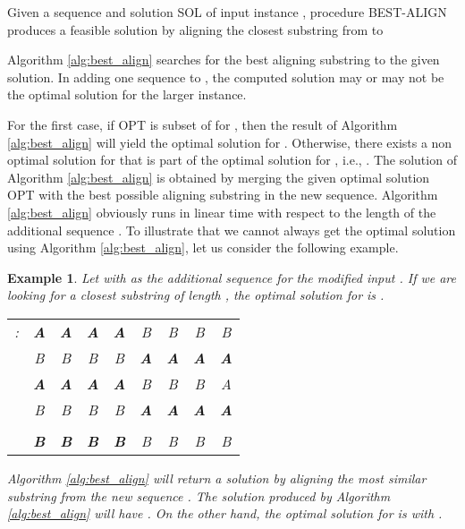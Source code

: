 \documentclass[journal]{acm_proc_article-sp}
\newtheorem{example}{Example}
\begin{document}
\begin{algorithm} 
\caption{Given a sequence  and solution SOL of input instance , procedure BEST-ALIGN produces a feasible solution  by aligning the closest substring from  to }
\label{alg:best_align}
\begin{algorithmic}[1]
\State{ }
\If{ }
\State{}
\State{}
\EndIf
\EndFor
\State{}
\EndProcedure
\end{algorithmic}
\end{algorithm}

Algorithm \ref{alg:best_align} searches for the best aligning substring  to the given solution. In adding one sequence to , the computed solution may or may not be the optimal solution for the larger instance. 

For the first case, if OPT is subset of  for , then the result of Algorithm \ref{alg:best_align} will yield the optimal solution for . Otherwise, there exists a non optimal solution for  that is part of the optimal solution for , i.e., . The solution  of Algorithm \ref{alg:best_align} is obtained by merging the given optimal solution OPT with the best possible aligning substring in the new sequence. Algorithm \ref{alg:best_align} obviously runs in linear time with respect to the length of the additional sequence . 
To illustrate that we cannot always get the optimal solution using Algorithm \ref{alg:best_align}, let us consider the following example.

\begin{example} \label{ex:1}
Let  with  as the additional sequence for the modified input . If we are looking for a closest substring of length , the optimal solution for  is  .  

\begin{center}
\begin{tabular}{ r  c c c c c c c c}
: &  {\bf A} & {\bf A} & {\bf A} & {\bf A} & B & B & B & B \\
 & B & B & B & B &  {\bf A} & {\bf A} & {\bf A} & {\bf A}  \\
 & {\bf A} & {\bf A} & {\bf A} & {\bf A} & B & B & B & A \\
 & B & B & B & B &  {\bf A} & {\bf A} & {\bf A} & {\bf A}  \\ \\

 &  {\bf B} & {\bf B} & {\bf B} & {\bf B} & B & B & B & B \\
\end{tabular}
\end{center}

Algorithm \ref{alg:best_align} will return a solution by aligning the most similar substring  from the new sequence . The solution produced by Algorithm \ref{alg:best_align} will have . On the other hand,  the optimal solution for  is  with . 
\end{example}
\end{document}
